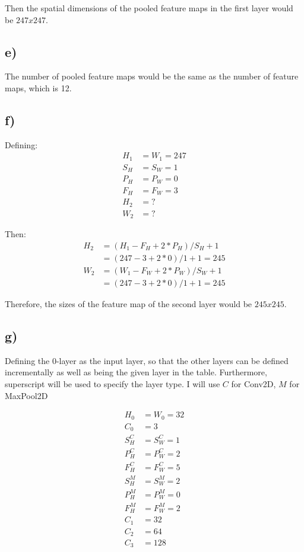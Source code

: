 Then the spatial dimensions of the pooled feature maps in the first layer would be $247x247$. 

\subsection*{e)}
The number of pooled feature maps would be the same as the number of feature maps, which is 12. 

\subsection*{f)}
Defining: 
\begin{align*}
    H_1 &= W_1 = 247 \\
    S_H &= S_W = 1 \\
    P_H &= P_W = 0 \\
    F_H &= F_W = 3 \\
    H_2 &= ? \\
    W_2 &= ?
\end{align*}

Then: 
\begin{align*}
    H_2 &= (H_1 - F_H + 2 * P_H) / S_H + 1 \\
    &= (247 - 3 + 2 * 0) / 1 + 1 = 245 \\
    W_2 &= (W_1 - F_W + 2 * P_W) / S_W + 1 \\
    &= (247 - 3 + 2 * 0) / 1 + 1 = 245
\end{align*}

Therefore, the sizes of the feature map of the second layer would be $245 x 245$. 

\subsection*{g)}
Defining the $0$-layer as the input layer, so that the other layers can be defined incrementally as well as being the given layer in the table. Furthermore, superscript will be used to specify the layer type. I will use $C$ for Conv2D, $M$ for MaxPool2D

\begin{align*}
    H_0 &= W_0 = 32 \\
    C_0 &= 3 \\
    S_H^C &= S_W^C = 1 \\
    P_H^C &= P_W^C = 2 \\
    F_H^C &= F_W^C = 5 \\
    S_H^M &= S_W^M = 2 \\
    P_H^M &= P_W^M = 0 \\
    F_H^M &= F_W^M = 2 \\
    C_1 &= 32 \\ 
    C_2 &= 64 \\
    C_3 &= 128
\end{align*}

